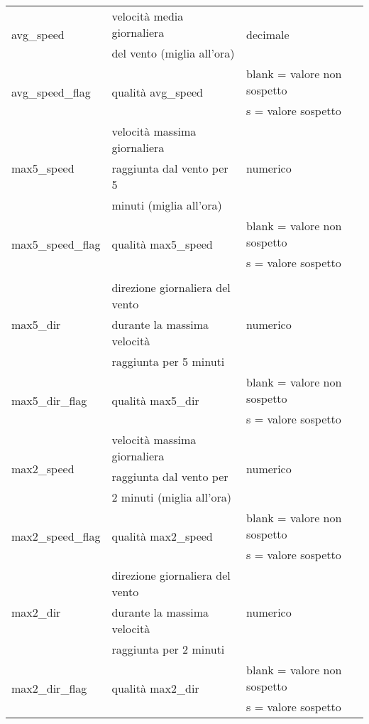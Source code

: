 \begin{longtable}{lll}
	\hline		
	\multirow{2}{*}{avg\_speed}		& velocità media giornaliera 	 & 	\multirow{2}{*}{decimale}	\\ 
	& del vento (miglia all'ora) &\\
	\hline	
	\multirow{2}{*}{avg\_speed\_flag}		& \multirow{2}{*}{qualità avg\_speed} &  blank = valore non sospetto \\
	& & s = valore sospetto			 \\ 
	\hline		
	\multirow{3}{*}{max5\_speed}		& velocità massima giornaliera 	 & 	\multirow{3}{*}{numerico}	\\ 
	& raggiunta dal vento per 5 &\\
	& minuti (miglia all'ora) &\\
	\hline	
	\multirow{2}{*}{max5\_speed\_flag}		& \multirow{2}{*}{qualità max5\_speed} &  blank = valore non sospetto \\
	& & s = valore sospetto			 \\ 
	\hline		
	\\
	\hline
	\multirow{3}{*}{max5\_dir}		& direzione giornaliera del vento  & 	\multirow{3}{*}{numerico}	\\ 
	& durante la massima velocità  &\\
	& raggiunta per 5 minuti &\\
	\hline
	\multirow{2}{*}{max5\_dir\_flag}		& \multirow{2}{*}{qualità max5\_dir} &  blank = valore non sospetto \\
	& & s = valore sospetto			 \\ 
	\hline	
	\multirow{3}{*}{max2\_speed}		& velocità massima giornaliera 	 & 	\multirow{3}{*}{numerico}	\\ 
	& raggiunta dal vento per &\\
	& 2 minuti (miglia all'ora) &\\
	\hline		
	\multirow{2}{*}{max2\_speed\_flag}		& \multirow{2}{*}{qualità max2\_speed} &  blank = valore non sospetto \\
	& & s = valore sospetto			 \\ 
	\hline			
	\multirow{3}{*}{max2\_dir}		& direzione giornaliera del vento  & 	\multirow{3}{*}{numerico}	\\ 
	& durante la massima velocità  &\\
	& raggiunta per 2 minuti &\\
	\hline
	\multirow{2}{*}{max2\_dir\_flag}		& \multirow{2}{*}{qualità max2\_dir} &  blank = valore non sospetto \\
	& & s = valore sospetto			 \\ 
	\bottomrule
\end{longtable}
\label{tab:attributi weather}

